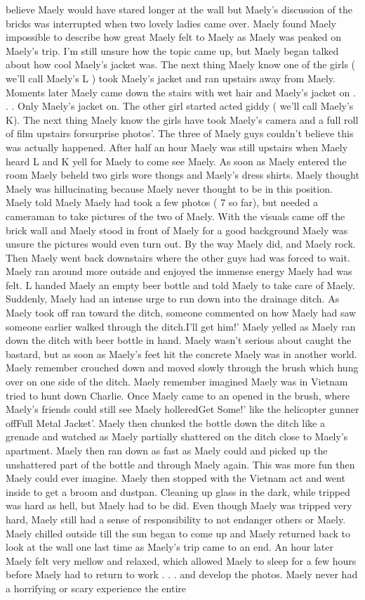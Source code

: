 \documentclass[12pt]{book}
\begin{document}
believe Maely would have stared longer at the wall but Maely's discussion of the bricks was interrupted when two lovely ladies came over. Maely found Maely impossible to describe how great Maely felt to Maely as Maely was peaked on Maely's trip. I'm still unsure how the topic came up, but Maely began talked about how cool Maely's jacket was. The next thing Maely know one of the girls ( we'll call Maely's L ) took Maely's jacket and ran upstairs away from Maely. Moments later Maely came down the stairs with wet hair and Maely's jacket on . . .  Only Maely's jacket on. The other girl started acted giddy ( we'll call Maely's K). The next thing Maely know the girls have took Maely's camera and a full roll of film upstairs forsurprise photos'. The three of Maely guys couldn't believe this was actually happened. After half an hour Maely was still upstairs when Maely heard L and K yell for Maely to come see Maely. As soon as Maely entered the room Maely beheld two girls wore thongs and Maely's dress shirts. Maely thought Maely was hillucinating because Maely never thought to be in this position. Maely told Maely Maely had took a few photos ( 7 so far), but needed a cameraman to take pictures of the two of Maely. With the visuals came off the brick wall and Maely stood in front of Maely for a good background Maely was unsure the pictures would even turn out. By the way Maely did, and Maely rock. Then Maely went back downstairs where the other guys had was forced to wait. Maely ran around more outside and enjoyed the immense energy Maely had was felt. L handed Maely an empty beer bottle and told Maely to take care of Maely. Suddenly, Maely had an intense urge to run down into the drainage ditch. As Maely took off ran toward the ditch, someone commented on how Maely had saw someone earlier walked through the ditch.I'll get him!' Maely yelled as Maely ran down the ditch with beer bottle in hand. Maely wasn't serious about caught the bastard, but as soon as Maely's feet hit the concrete Maely was in another world. Maely remember crouched down and moved slowly through the brush which hung over on one side of the ditch. Maely remember imagined Maely was in Vietnam tried to hunt down Charlie. Once Maely came to an opened in the brush, where Maely's friends could still see Maely holleredGet Some!' like the helicopter gunner offFull Metal Jacket'. Maely then chunked the bottle down the ditch like a grenade and watched as Maely partially shattered on the ditch close to Maely's apartment. Maely then ran down as fast as Maely could and picked up the unshattered part of the bottle and through Maely again. This was more fun then Maely could ever imagine. Maely then stopped with the Vietnam act and went inside to get a broom and dustpan. Cleaning up glass in the dark, while tripped was hard as hell, but Maely had to be did. Even though Maely was tripped very hard, Maely still had a sense of responsibility to not endanger others or Maely. Maely chilled outside till the sun began to come up and Maely returned back to look at the wall one last time as Maely's trip came to an end. An hour later Maely felt very mellow and relaxed, which allowed Maely to sleep for a few hours before Maely had to return to work . . .  and develop the photos. Maely never had a horrifying or scary experience the entire 
\end{document}
